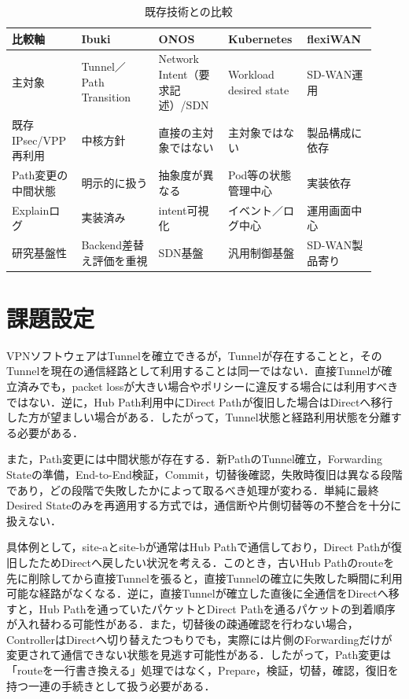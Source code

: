 \documentclass[11pt,a4paper,twoside]{ltjsarticle}
\begin{document}
\begin{table}[h]
\centering
\caption{既存技術との比較}
\label{tab:comparison}
\begin{tabular}{>{\raggedright\arraybackslash}p{0.18\linewidth}>{\raggedright\arraybackslash}p{0.20\linewidth}>{\raggedright\arraybackslash}p{0.18\linewidth}>{\raggedright\arraybackslash}p{0.18\linewidth}>{\raggedright\arraybackslash}p{0.18\linewidth}}
\toprule
比較軸 & Ibuki & ONOS & Kubernetes & flexiWAN \\
\midrule
主対象 & Tunnel／Path Transition & Network Intent（要求記述）/SDN & Workload desired state & SD-WAN運用 \\
既存IPsec/VPP再利用 & 中核方針 & 直接の主対象ではない & 主対象ではない & 製品構成に依存 \\
Path変更の中間状態 & 明示的に扱う & 抽象度が異なる & Pod等の状態管理中心 & 実装依存 \\
Explainログ & 実装済み & intent可視化 & イベント／ログ中心 & 運用画面中心 \\
研究基盤性 & Backend差替え評価を重視 & SDN基盤 & 汎用制御基盤 & SD-WAN製品寄り \\
\bottomrule
\end{tabular}
\end{table}

\section{課題設定}
VPNソフトウェアはTunnelを確立できるが，Tunnelが存在することと，そのTunnelを現在の通信経路として利用することは同一ではない．直接Tunnelが確立済みでも，packet lossが大きい場合やポリシーに違反する場合には利用すべきではない．逆に，Hub Path利用中にDirect Pathが復旧した場合はDirectへ移行した方が望ましい場合がある．したがって，Tunnel状態と経路利用状態を分離する必要がある．

また，Path変更には中間状態が存在する．新PathのTunnel確立，Forwarding Stateの準備，End-to-End検証，Commit，切替後確認，失敗時復旧は異なる段階であり，どの段階で失敗したかによって取るべき処理が変わる．単純に最終Desired Stateのみを再適用する方式では，通信断や片側切替等の不整合を十分に扱えない．

具体例として，site-aとsite-bが通常はHub Pathで通信しており，Direct Pathが復旧したためDirectへ戻したい状況を考える．このとき，古いHub Pathのrouteを先に削除してから直接Tunnelを張ると，直接Tunnelの確立に失敗した瞬間に利用可能な経路がなくなる．逆に，直接Tunnelが確立した直後に全通信をDirectへ移すと，Hub Pathを通っていたパケットとDirect Pathを通るパケットの到着順序が入れ替わる可能性がある．また，切替後の疎通確認を行わない場合，ControllerはDirectへ切り替えたつもりでも，実際には片側のForwardingだけが変更されて通信できない状態を見逃す可能性がある．したがって，Path変更は「routeを一行書き換える」処理ではなく，Prepare，検証，切替，確認，復旧を持つ一連の手続きとして扱う必要がある．
\end{document}
